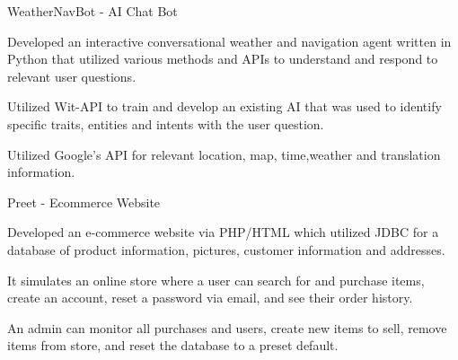 \vspace{-1ex}

\begin{cventries}

   \cventry
    {} %
    {WeatherNavBot - AI Chat Bot} %
    {} %
    {} %
    {
    \vspace{-5ex}
      \begin{cvitems} %
      \vspace{1.5ex}
        \item { Developed an interactive conversational weather and navigation agent written in Python that utilized various methods and APIs to understand and respond to relevant user questions. }
        \item {Utilized Wit-API to train and develop an existing AI that was used to identify specific traits, entities and intents with the user question.}
         \item { Utilized Google's API for relevant location, map, time,weather and translation information.}
      \end{cvitems}
    }
  

 \cventry
    {} %
    {Preet - Ecommerce Website} %
    {} %
    {} %
    {
    \vspace{-5ex}
      \begin{cvitems} %
      \vspace{1ex}
        \item {Developed an e-commerce website via PHP/HTML which utilized JDBC for a database of product information, pictures, customer information and addresses.}
        \item{It simulates an online store where a user can search for and purchase items, create an account, reset a password via email, and see their order history.} 
        \item{An admin can monitor all purchases and users, create new items to sell, remove items from store, and reset the database to a preset default.}
      \end{cvitems}
    }



\end{cventries}
